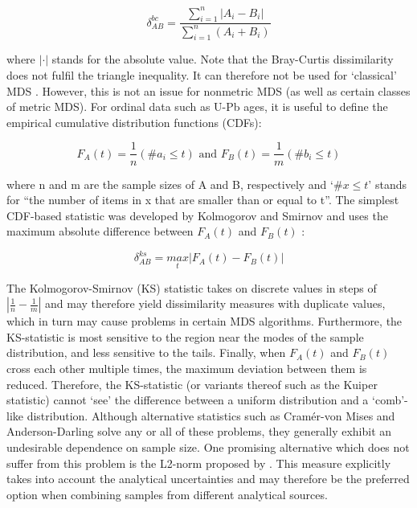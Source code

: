 \documentclass{article}
\begin{document}
\begin{equation}
\delta^{bc}_{AB} = \frac{\sum\limits_{i=1}^{n} |A_i - B_i|}{\sum\limits_{i=1}^{n} (A_i + B_i)}
\label{eq:bray}
\end{equation}

where $|\cdot|$ stands for the absolute value. Note that the
Bray-Curtis dissimilarity does not fulfil the triangle inequality. It
can therefore not be used for `classical' MDS \citep[in which the
  disparity transformation is the identity
  matrix,][]{vermeesch2013}. However, this is not an issue for
nonmetric MDS (as well as certain classes of metric MDS). For ordinal
data such as U-Pb ages, it is useful to define the empirical
cumulative distribution functions (CDFs):

\begin{equation}
F_A(t) = \frac{1}{n}(\#a_i \leq t) \mbox{ and } F_B(t) = \frac{1}{m}(\#b_i \leq t)
\label{eq:cdf}
\end{equation}

where n and m are the sample sizes of A and B, respectively and `$\#x
\leq t$' stands for ``the number of items in x that are smaller than
or equal to t''. The simplest CDF-based statistic was developed by
Kolmogorov and Smirnov and uses the maximum absolute difference
between $F_A(t)$ and $F_B(t)$ \citep{feller1948}:

\begin{equation}
\delta^{ks}_{AB} = \underset{t}{max}|F_A(t)-F_B(t)|
\label{eq:ks}
\end{equation}

The Kolmogorov-Smirnov (KS) statistic takes on discrete values in
steps of $|\frac{1}{n} - \frac{1}{m}|$ and may therefore yield
dissimilarity measures with duplicate values, which in turn may cause
problems in certain MDS algorithms.  Furthermore, the KS-statistic is
most sensitive to the region near the modes of the sample
distribution, and less sensitive to the tails.  Finally, when $F_A(t)$
and $F_B(t)$ cross each other multiple times, the maximum deviation
between them is reduced. Therefore, the KS-statistic (or variants
thereof such as the Kuiper statistic) cannot `see' the difference
between a uniform distribution and a `comb'-like
distribution. Although alternative statistics such as Cram\'{e}r-von
Mises and Anderson-Darling solve any or all of these problems, they
generally exhibit an undesirable dependence on sample size. One
promising alternative which does not suffer from this problem is the
L2-norm proposed by \citet{sircombe2004a}. This measure explicitly
takes into account the analytical uncertainties and may therefore be
the preferred option when combining samples from different analytical
sources.
\end{document}
